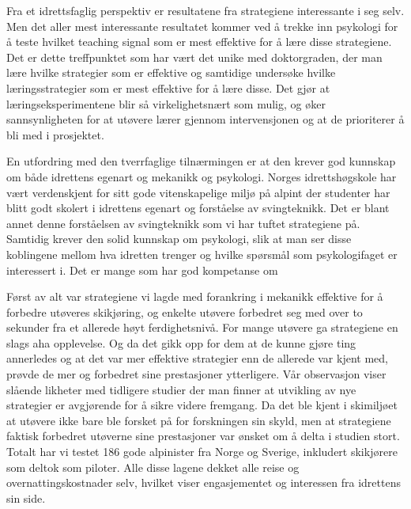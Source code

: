 Fra et idrettsfaglig perspektiv er resultatene fra strategiene interessante i seg selv. Men det aller mest interessante resultatet kommer ved å trekke inn psykologi for å teste hvilket teaching signal som er mest effektive for å lære disse strategiene. Det er dette treffpunktet som har vært det unike med doktorgraden, der man lære hvilke strategier som er effektive og samtidige undersøke hvilke læringsstrategier som er mest effektive for å lære disse. Det gjør at læringseksperimentene blir så virkelighetsnært som mulig, og øker sannsynligheten for at utøvere lærer gjennom intervensjonen og at de prioriterer å bli med i prosjektet.

En utfordring med den tverrfaglige tilnærmingen er at den krever god kunnskap om både idrettens egenart og mekanikk og psykologi. Norges idrettshøgskole har vært verdenskjent for sitt gode vitenskapelige miljø på alpint der studenter har blitt godt skolert i idrettens egenart og forståelse av svingteknikk. Det er blant annet denne forståelsen av svingteknikk som vi har tuftet strategiene på. Samtidig krever den solid kunnskap om psykologi, slik at man ser disse koblingene mellom hva idretten trenger og hvilke spørsmål som psykologifaget er interessert i. Det er mange som har god kompetanse om 













Først av alt var strategiene vi lagde med forankring i mekanikk effektive for å forbedre utøveres skikjøring, og enkelte utøvere forbedret seg med over to sekunder fra et allerede høyt ferdighetsnivå. For mange utøvere ga strategiene en slags aha opplevelse. Og da det gikk opp for dem at de kunne gjøre ting annerledes og at det var mer effektive strategier enn de allerede var kjent med, prøvde de mer og forbedret sine prestasjoner ytterligere. Vår observasjon viser slående likheter med tidligere studier der man finner at utvikling av nye strategier er avgjørende for å sikre videre fremgang. Da det ble kjent i skimiljøet at utøvere ikke bare ble forsket på for forskningen sin skyld, men at strategiene faktisk forbedret utøverne sine prestasjoner var ønsket om å delta i studien stort. Totalt har vi testet 186 gode alpinister fra Norge og Sverige, inkludert skikjørere som deltok som piloter. Alle disse lagene dekket alle reise og overnattingskostnader selv, hvilket viser engasjementet og interessen fra idrettens sin side. 

